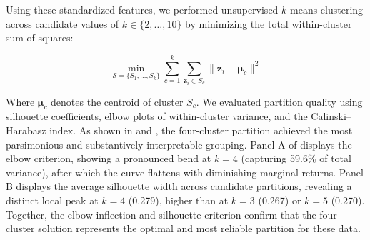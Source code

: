 \documentclass[12pt]{article}
\begin{document}


Using these standardized features, we performed unsupervised $k$-means clustering across candidate values of $k \in \{2, \dots, 10\}$ by minimizing the total within-cluster sum of squares:

\begin{equation}
\min_{\mathcal{S} = \{S_1, \dots, S_k\}} \sum_{c=1}^k \sum_{\mathbf{z}_i \in S_c} \|\mathbf{z}_i - \boldsymbol{\mu}_c\|^2
\end{equation}

Where $\boldsymbol{\mu}_c$ denotes the centroid of cluster $S_c$. We evaluated partition quality using silhouette coefficients, elbow plots of within-cluster variance, and the Calinski--Harabasz index. As shown in  and , the four-cluster partition achieved the most parsimonious and substantively interpretable grouping. Panel A of  displays the elbow criterion, showing a pronounced bend at $k = 4$ (capturing 59.6\% of total variance), after which the curve flattens with diminishing marginal returns. Panel B displays the average silhouette width across candidate partitions, revealing a distinct local peak at $k = 4$ (0.279), higher than at $k = 3$ (0.267) or $k = 5$ (0.270). Together, the elbow inflection and silhouette criterion confirm that the four-cluster solution represents the optimal and most reliable partition for these data.
\end{document}
